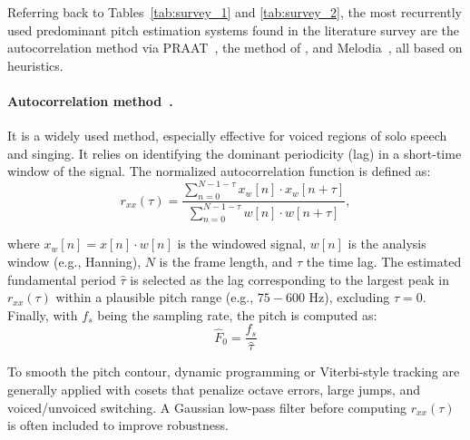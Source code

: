 Referring back to Tables~\ref{tab:survey_1} and \ref{tab:survey_2}, the most recurrently used predominant pitch estimation systems found in the literature survey are the autocorrelation method via PRAAT~\citep{boersma-praat}, the method of \citep{rao-pitch}, and Melodia~\citep{salamon-melodia}, all based on heuristics. 
%

\paragraph*{Autocorrelation method~\citep{boersma-praat}.}

It is a widely used method, especially effective for voiced regions of solo speech and singing. It relies on identifying the dominant periodicity (lag) in a short-time window of the signal. The normalized autocorrelation function is defined as:
\begin{equation}
    r_{xx}(\tau) = \frac{\sum_{n=0}^{N-1-\tau} x_w[n] \cdot x_w[n + \tau]}{\sum_{n=0}^{N-1-\tau} w[n] \cdot w[n + \tau]},
\end{equation}

where $x_w[n] = x[n] \cdot w[n]$ is the windowed signal, $w[n]$ is the analysis window (e.g., Hanning), $N$ is the frame length, and $\tau$ the time lag. The estimated fundamental period $\hat{\tau}$ is selected as the lag corresponding to the largest peak in $r_{xx}(\tau)$ within a plausible pitch range (e.g., $75-600$ Hz), excluding $\tau = 0$.
%
Finally, with $f_s$ being the sampling rate, the pitch is computed as:
\begin{equation}
    \hat{F}_0 = \frac{f_s}{\hat{\tau}}
\end{equation}

To smooth the pitch contour, dynamic programming or Viterbi-style tracking are generally applied with cosets that penalize octave errors, large jumps, and voiced/unvoiced switching. A Gaussian low-pass filter before computing $r_{xx}(\tau)$ is often included to improve robustness.

